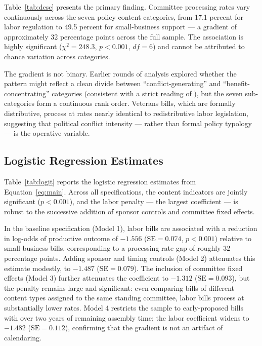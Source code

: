 \documentclass[11pt]{article}
\begin{document}
Table~\ref{tab:desc} presents the primary finding. Committee processing rates vary continuously across the seven policy content categories, from 17.1 percent for labor regulation to 49.5 percent for small-business support --- a gradient of approximately 32 percentage points across the full sample. The association is highly significant ($\chi^2 = 248.3$, $p < 0.001$, $df = 6$) and cannot be attributed to chance variation across categories.

The gradient is not binary. Earlier rounds of analysis explored whether the pattern might reflect a clean divide between ``conflict-generating'' and ``benefit-concentrating'' categories (consistent with a strict reading of \citealp{lowi1964}), but the seven sub-categories form a continuous rank order. Veterans bills, which are formally distributive, process at rates nearly identical to redistributive labor legislation, suggesting that political conflict intensity --- rather than formal policy typology --- is the operative variable.

\subsection{Logistic Regression Estimates}

Table~\ref{tab:logit} reports the logistic regression estimates from Equation~\ref{eq:main}. Across all specifications, the content indicators are jointly significant ($p < 0.001$), and the labor penalty --- the largest coefficient --- is robust to the successive addition of sponsor controls and committee fixed effects.

In the baseline specification (Model 1), labor bills are associated with a reduction in log-odds of productive outcome of $-1.556$ ($\text{SE} = 0.074$, $p < 0.001$) relative to small-business bills, corresponding to a processing rate gap of roughly 32 percentage points. Adding sponsor and timing controls (Model 2) attenuates this estimate modestly, to $-1.487$ ($\text{SE} = 0.079$). The inclusion of committee fixed effects (Model 3) further attenuates the coefficient to $-1.312$ ($\text{SE} = 0.093$), but the penalty remains large and significant: even comparing bills of different content types assigned to the same standing committee, labor bills process at substantially lower rates. Model 4 restricts the sample to early-proposed bills with over two years of remaining assembly time; the labor coefficient widens to $-1.482$ ($\text{SE} = 0.112$), confirming that the gradient is not an artifact of calendaring.
\end{document}
